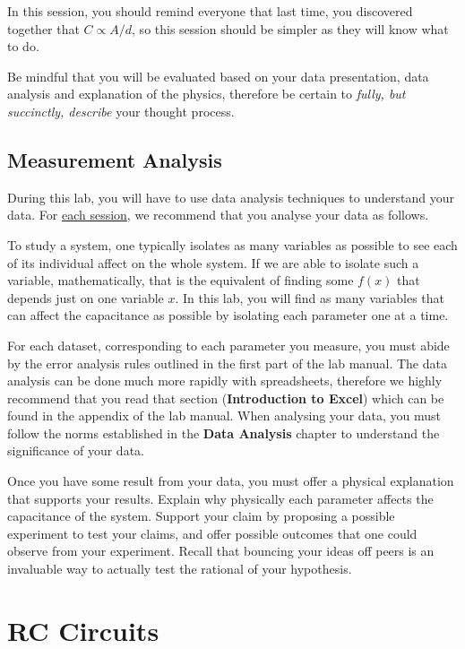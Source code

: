 \documentclass[12pt]{report}
\begin{document}
\begin{tcolorbox}[title=Session \#2]
In this session, you should remind everyone that last time, you discovered together that $C \propto A/d$, so this session should be simpler as they will know what to do.
\end{tcolorbox}

Be mindful that you will be evaluated based on your data presentation, data analysis and explanation of the physics, therefore be certain to \textit{fully, but succinctly, describe} your thought process. 

\section{Measurement Analysis}
During this lab, you will have to use data analysis techniques to understand your data. For \underline{each session}, we recommend that you analyse your data as follows.

To study a system, one typically isolates as many variables as possible to see each of its individual affect on the whole system. If we are able to isolate such a variable, mathematically, that is the equivalent of finding some $f(x)$ that depends just on one variable $x$. In this lab, you will find as many variables that can affect the capacitance as possible by isolating each parameter one at a time.

For each dataset, corresponding to each parameter you measure, you must abide by the error analysis rules outlined in the first part of the lab manual. The data analysis can be done much more rapidly with spreadsheets, therefore we highly recommend that you read that section (\textbf{Introduction to Excel}) which can be found in the appendix of the lab manual. When analysing your data, you must follow the norms established in the \textbf{Data Analysis} chapter to understand the significance of your data. 

Once you have some result from your data, you must offer a physical explanation that supports your results. Explain why physically each parameter affects the capacitance of the system. Support your claim by proposing a possible experiment to test your claims, and offer possible outcomes that one could observe from your experiment. Recall that bouncing your ideas off peers is an invaluable way to actually test the rational of your hypothesis.


\chapter{RC Circuits}
\end{document}
